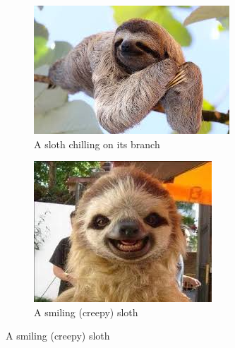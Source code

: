 \documentclass[a4paper,12pt,final]{article}
\begin{document}
	\begin{figure}
		\centering
		\begin{subfigure}{0.45\textwidth}
			\includegraphics[width=\textwidth]{sloth}
			\caption{A sloth chilling on its branch}
		\end{subfigure}
		\hfill
		\begin{subfigure}{0.45\textwidth}
			\includegraphics[width=\textwidth]{baby}
			\caption{A smiling (creepy) sloth}
		\end{subfigure}
		

\end{figure}
\end{document}
